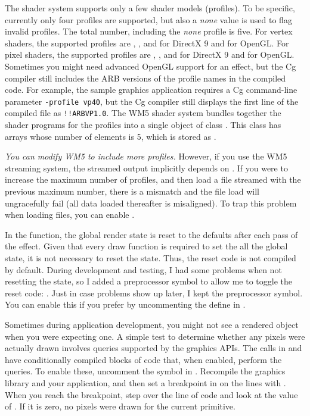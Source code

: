 \documentclass{article}
\begin{document}
The shader system supports only a few shader models (profiles).  To be
specific, currently only four profiles are supported, but also a {\em none}
value is used to flag invalid profiles.  The total number, including
the {\em none} profile is five. For vertex shaders, the supported profiles
are , , and  for DirectX 9 and
 for OpenGL.  For pixel shaders, the supported profiles are
, , and  for DirectX 9 and
 for OpenGL.  Sometimes you might need advanced OpenGL support
for an effect, but the Cg compiler still includes the ARB versions of the
profile names in the compiled code.  For example, the sample graphics
application  requires a Cg command-line parameter
\verb|-profile vp40|, but the Cg compiler still displays the first line
of the compiled file as \verb|!!ARBVP1.0|.  The WM5 shader system bundles
together the shader programs for the profiles into a single object of class
.  This class has arrays whose number of elements is 5, which
is stored as .

{\em You can modify WM5 to include more profiles.}  However, if you use the
WM5 streaming system, the streamed output implicitly depends on
.  If you were to increase the maximum number
of profiles, and then load a file streamed with the previous maximum number,
there is a mismatch and the file load will ungracefully fail (all data loaded
thereafter is misaligned).  To trap this problem when loading files, you can
enable .

In the 
function, the global render state is reset to the defaults after each pass
of the effect.  Given that every draw function is required to set the
all the global state, it is not necessary to reset the state.  Thus, the
reset code is not compiled by default.  During development and testing, I
had some problems when not resetting the state, so I added a preprocessor
symbol to allow me to toggle the reset code:
.  Just in case problems show up later,
I kept the preprocessor symbol.  You can enable this if you prefer by
uncommenting the define in .

Sometimes during application development, you might not see a rendered
object when you were expecting one.  A simple test to determine whether
any pixels were actually drawn involves queries supported by the graphics
APIs.  The  calls in 
and  have conditionally compiled blocks of
code that, when enabled, perform the queries.  To enable these, uncomment
the  symbol in .
Recompile the graphics library and your application, and then set a
breakpoint in  on the lines with .
When you reach the breakpoint, step over the line of code and look at the
value of .  If it is zero, no pixels were drawn for
the current primitive.
\end{document}
